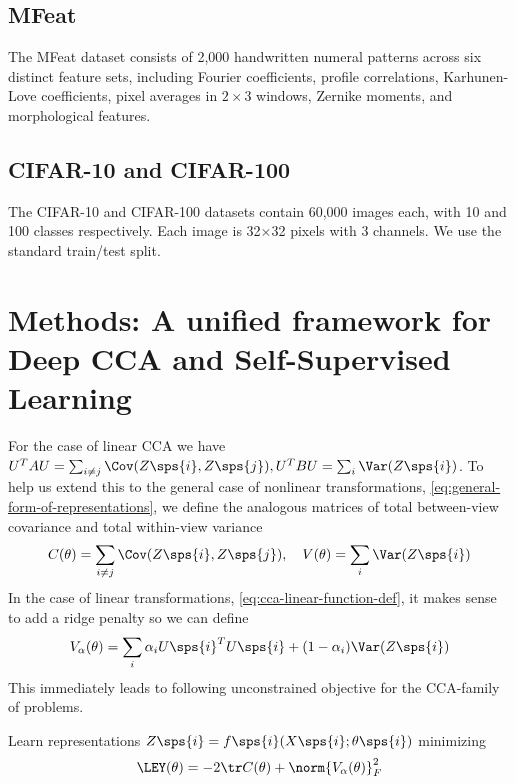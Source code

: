 \subsection{MFeat}
The MFeat dataset  consists of 2,000 handwritten numeral patterns across six distinct feature sets, including Fourier coefficients, profile correlations, Karhunen-Love coefficients, pixel averages in \(2 \times 3\) windows, Zernike moments, and morphological features.


\subsection{CIFAR-10 and CIFAR-100}
The CIFAR-10 and CIFAR-100 datasets contain 60,000 images each, with 10 and 100 classes respectively. Each image is 32$\times$32 pixels with 3 channels. We use the standard train/test split.


\section{Methods: A unified framework for Deep CCA and Self-Supervised Learning}

For the case of linear CCA we have $U^T A U = \sum_{i \neq j} \Cov(Z\sps{i}, Z\sps{j}), U^T B U = \sum_{i} \Var(Z\sps{i})$.
To help us extend this to the general case of nonlinear transformations, \cref{eq:general-form-of-representations}, we define the analogous matrices of total between-view covariance and total within-view variance
\begin{align}\label{eq:def-C-V-matrices}
    \vphantom{\bigl(\bigr)} %
    C(\theta) = \sum_{i \neq j} \Cov(Z\sps{i}, Z\sps{j}), \quad
    V(\theta) = \sum_{i} \Var(Z\sps{i})
\end{align}
In the case of linear transformations, \cref{eq:cca-linear-function-def}, it makes sense to add a ridge penalty so we can define
\begin{align}\label{eq:v-alpha-ridge-definition}
    V_\alpha(\theta) = \sum_i \alpha_i {U\sps{i}}^T U\sps{i} +  (1 - \alpha_i) \Var(Z\sps{i})
\end{align}
This immediately leads to following unconstrained objective for the CCA-family of problems.
\begin{definition}
    Learn representations $Z\sps{i} = f\sps{i}( X\sps{i}; \theta\sps{i})$ minimizing
    \begin{align}\label{eq:EY-loss-def-C-V}
        \LEY(\theta) = - 2 \tr C(\theta) + \norm{V_\alpha(\theta)}_F^2
    \end{align}
\end{definition}

